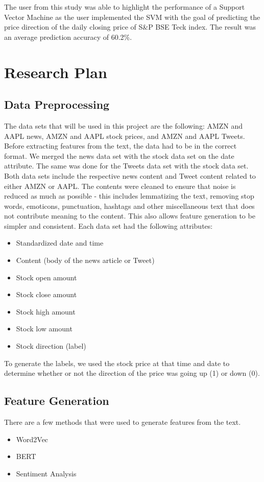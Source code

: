 \documentclass[conference]{IEEEtran}
\begin{document}
The user from this study \cite{b14} was able to highlight the performance of a Support Vector Machine as the user implemented the SVM with the goal of predicting the price direction of the daily closing price of S\&P BSE Teck index. The result was an average prediction accuracy of 60.2\%. 


\section{Research Plan}
\subsection{Data Preprocessing}\label{AA}
The data sets that will be used in this project are the following: AMZN and AAPL news, AMZN and AAPL stock prices, and AMZN and AAPL Tweets. Before extracting features from the text, the data had to be in the correct format. We merged the news data set with the stock data set on the date attribute. The same was done for the Tweets data set with the stock data set. Both data sets include the respective news content and Tweet content related to either AMZN or AAPL. The contents were cleaned to ensure that noise is reduced as much as possible - this includes lemmatizing the text, removing stop words, emoticons, punctuation, hashtags and other miscellaneous text that does not contribute meaning to the content. This also allows feature generation to be simpler and consistent. Each data set had the following attributes:
\begin{itemize}
    \item Standardized date and time
    \item Content (body of the news article or Tweet)
    \item Stock open amount
    \item Stock close amount
    \item Stock high amount
    \item Stock low amount
    \item Stock direction (label)
\end{itemize}
To generate the labels, we used the stock price at that time and date to determine whether or not the direction of the price was going up (1) or down (0).

\subsection{Feature Generation}
There are a few methods that were used to generate features from the text.
\begin{itemize}
    \item Word2Vec
    \item BERT
    \item Sentiment Analysis
\end{itemize}
\end{document}
